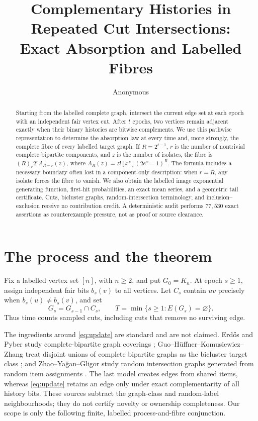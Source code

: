 \documentclass[a4paper,10pt]{amsart}
\title[Repeated cut intersections]{Complementary Histories in Repeated Cut Intersections:\\
Exact Absorption and Labelled Fibres}
\author{Anonymous}
\date{}
\theoremstyle{remark}
\begin{document}
\begin{abstract}
Starting from the labelled complete graph, intersect the current edge set at
each epoch with an independent fair vertex cut.  After $t$ epochs, two
vertices remain adjacent exactly when their binary histories are bitwise
complements.  We use this pathwise representation to determine the absorption
law at every time and, more strongly, the complete fibre of every labelled
target graph.  If $R=2^{t-1}$, $r$ is the number of nontrivial complete
bipartite components, and $z$ is the number of isolates, the fibre is
$(R)_r2^r A_{R-r}(z)$, where
$A_R(z)=z![x^z](2e^x-1)^R$.  The formula includes a necessary boundary often
lost in a component-only description: when $r=R$, any isolate forces the
fibre to vanish.  We also obtain the labelled image exponential generating
function, first-hit probabilities, an exact mean series, and a geometric
tail certificate.  Cuts, bicluster graphs, random-intersection terminology,
and inclusion--exclusion receive no contribution credit.  A deterministic
audit performs $77{,}530$ exact assertions as counterexample pressure, not as
proof or source clearance.
\end{abstract}

\maketitle

\section{The process and the theorem}\label{sec:setup}

Fix a labelled vertex set $[n]$, with $n\geq2$, and put $G_0=K_n$.
At epoch $s\geq1$, assign independent fair bits $b_s(v)$ to all vertices.
Let $C_s$ contain $uv$ precisely when $b_s(u)\ne b_s(v)$, and set
\begin{equation}\label{eq:update}
 G_s=G_{s-1}\cap C_s,
 \qquad
 T=\min\{s\geq1:E(G_s)=\varnothing\}.
\end{equation}
Thus time counts sampled cuts, including cuts that remove no surviving edge.

The ingredients around \eqref{eq:update} are standard and are not claimed.
Erd\H{o}s and Pyber study complete-bipartite graph coverings
\cite{ErdosPyber1997}; Guo--H\"uffner--Komusiewicz--Zhang treat disjoint
unions of complete bipartite graphs as the bicluster target class
\cite{GuoHuffnerKomusiewiczZhang2008}; and Zhao--Ya\u{g}an--Gligor study
random intersection graphs generated from random item assignments
\cite{ZhaoYaganGligor2015}.  The last model creates edges from shared items,
whereas \eqref{eq:update} retains an edge only under exact complementarity of
all history bits.  These sources subtract the graph-class and random-label
neighbourhoods; they do not certify novelty or ownership completeness.  Our
scope is only the following finite, labelled process-and-fibre conjunction.
\end{document}
